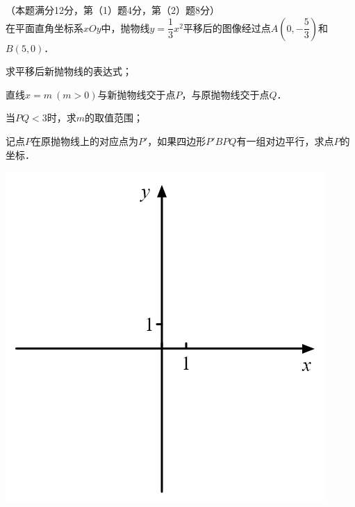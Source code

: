 \documentclass{article}
\begin{document}
\begin{question}[24]
    \item （本题满分12分，第（1）题4分，第（2）题8分）\\[5pt]
    在平面直角坐标系$xOy$中，抛物线$y=\dfrac{1}{3}x^2$平移后的图像经过点$A(0,-\dfrac{5}{3})$和$B(5,0)$．\\[5pt]
    \begin{minipage}[t]{.6\textwidth}
        \begin{squestion}
            \item 求平移后新抛物线的表达式；
            \item 直线$x=m~(m>0)$与新抛物线交于点$P$，与原抛物线交于点$Q$．
            \begin{ssquestion}
                \item 当$PQ<3$时，求$m$的取值范围；
                \item 记点$P$在原抛物线上的对应点为$P'$，如果四边形$P'BPQ$有一组对边平行，求点$P$的坐标．
            \end{ssquestion}
        \end{squestion}
    \end{minipage}
    \begin{minipage}[t]{.4\textwidth}
        \centering
        \vspace{-2ex}
        \includegraphics[scale=0.3]{images/p6.png}
    \end{minipage}
\end{question} \leavevmode \\[20pt]
\end{document}
